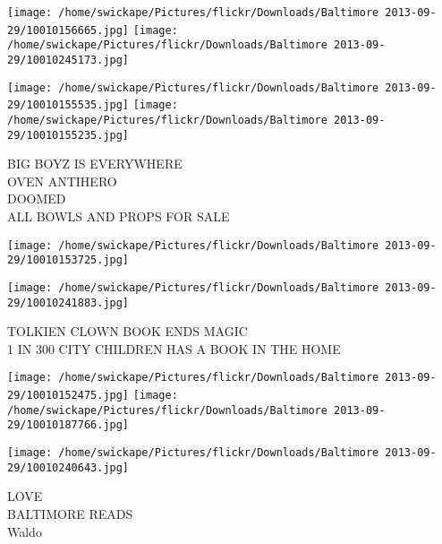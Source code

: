 \documentclass[10pt,letterpaper]{article}
\begin{document}
\texttt{[image: /home/swickape/Pictures/flickr/Downloads/Baltimore 2013-09-29/10010156665.jpg]}
\texttt{[image: /home/swickape/Pictures/flickr/Downloads/Baltimore 2013-09-29/10010245173.jpg]}

\texttt{[image: /home/swickape/Pictures/flickr/Downloads/Baltimore 2013-09-29/10010155535.jpg]}
\texttt{[image: /home/swickape/Pictures/flickr/Downloads/Baltimore 2013-09-29/10010155235.jpg]}

BIG BOYZ IS EVERYWHERE\\
OVEN ANTIHERO\\
DOOMED\\
ALL BOWLS AND PROPS FOR SALE\\
\pagebreak

\texttt{[image: /home/swickape/Pictures/flickr/Downloads/Baltimore 2013-09-29/10010153725.jpg]}

\vspace{0.25in}
\texttt{[image: /home/swickape/Pictures/flickr/Downloads/Baltimore 2013-09-29/10010241883.jpg]}

TOLKIEN CLOWN BOOK ENDS MAGIC\\
1 IN 300 CITY CHILDREN HAS A BOOK IN THE HOME\\
\pagebreak

\texttt{[image: /home/swickape/Pictures/flickr/Downloads/Baltimore 2013-09-29/10010152475.jpg]}
\texttt{[image: /home/swickape/Pictures/flickr/Downloads/Baltimore 2013-09-29/10010187766.jpg]}

\texttt{[image: /home/swickape/Pictures/flickr/Downloads/Baltimore 2013-09-29/10010240643.jpg]}

LOVE\\
BALTIMORE READS\\
Waldo\\
\pagebreak
\end{document}
